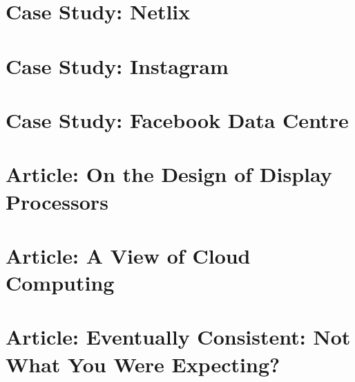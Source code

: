 \documentclass[11pt]{article}
\begin{document}
\section{Case Study: Netlix}



\section{Case Study: Instagram}



\section{Case Study: Facebook Data Centre}



\section{Article: On the Design of Display Processors}



\section{Article: A View of Cloud Computing}



\section{Article: Eventually Consistent: Not What You Were Expecting?}
\end{document}
